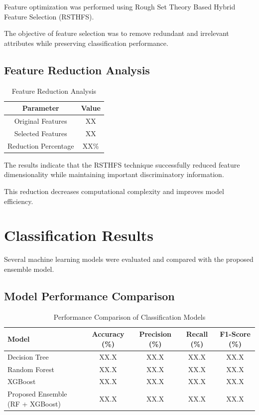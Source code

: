 \documentclass[12pt]{report}
\begin{document}
Feature optimization was performed using Rough Set Theory Based Hybrid Feature Selection (RSTHFS).

The objective of feature selection was to remove redundant and irrelevant attributes while preserving classification performance.

\subsection{Feature Reduction Analysis}

\begin{table}[H]
\centering
\caption{Feature Reduction Analysis}
\begin{tabular}{|c|c|}
\hline
Parameter & Value \\
\hline
Original Features & XX \\
\hline
Selected Features & XX \\
\hline
Reduction Percentage & XX\% \\
\hline
\end{tabular}
\end{table}

The results indicate that the RSTHFS technique successfully reduced feature dimensionality while maintaining important discriminatory information.

This reduction decreases computational complexity and improves model efficiency.

\section{Classification Results}

Several machine learning models were evaluated and compared with the proposed ensemble model.

\subsection{Model Performance Comparison}

\begin{table}[H]
\centering
\caption{Performance Comparison of Classification Models}
\begin{tabular}{|l|c|c|c|c|}
\hline
Model & Accuracy (\%) & Precision (\%) & Recall (\%) & F1-Score (\%) \\
\hline
Decision Tree & XX.X & XX.X & XX.X & XX.X \\
\hline
Random Forest & XX.X & XX.X & XX.X & XX.X \\
\hline
XGBoost & XX.X & XX.X & XX.X & XX.X \\
\hline
Proposed Ensemble (RF + XGBoost) & XX.X & XX.X & XX.X & XX.X \\
\hline
\end{tabular}
\end{table}
\end{document}
